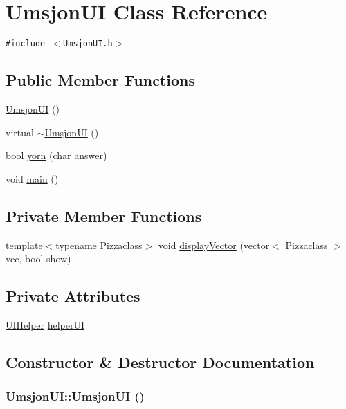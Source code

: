 \hypertarget{class_umsjon_u_i}{
\section{Umsjon\-UI Class Reference}
\label{class_umsjon_u_i}
}
{\tt \#include $<$Umsjon\-UI.h$>$}

\subsection*{Public Member Functions}
\begin{CompactItemize}
\item 
\hyperlink{class_umsjon_u_i_f327260d03ec6a1022392d59d31b1afb}{Umsjon\-UI} ()
\item 
virtual \hyperlink{class_umsjon_u_i_afbb13b128eef1970fc6e090ff07635e}{$\sim$Umsjon\-UI} ()
\item 
bool \hyperlink{class_umsjon_u_i_e1489f835e125c37fb30e595797d971d}{yorn} (char answer)
\item 
void \hyperlink{class_umsjon_u_i_ea83b916b3f52eec32ae6d54d59b4453}{main} ()
\end{CompactItemize}
\subsection*{Private Member Functions}
\begin{CompactItemize}
\item 
template$<$typename Pizzaclass$>$ void \hyperlink{class_umsjon_u_i_f5fa5a8e9efaecd233787825f22c4e76}{display\-Vector} (vector$<$ Pizzaclass $>$ vec, bool show)
\end{CompactItemize}
\subsection*{Private Attributes}
\begin{CompactItemize}
\item 
\hyperlink{class_u_i_helper}{UIHelper} \hyperlink{class_umsjon_u_i_165ca02db075e280199e0970e3465900}{helper\-UI}
\end{CompactItemize}


\subsection{Constructor \& Destructor Documentation}
\hypertarget{class_umsjon_u_i_f327260d03ec6a1022392d59d31b1afb}{
\subsubsection[UmsjonUI]{\setlength{\rightskip}{0pt plus 5cm}Umsjon\-UI::Umsjon\-UI ()}}
\label{class_umsjon_u_i_f327260d03ec6a1022392d59d31b1afb}


